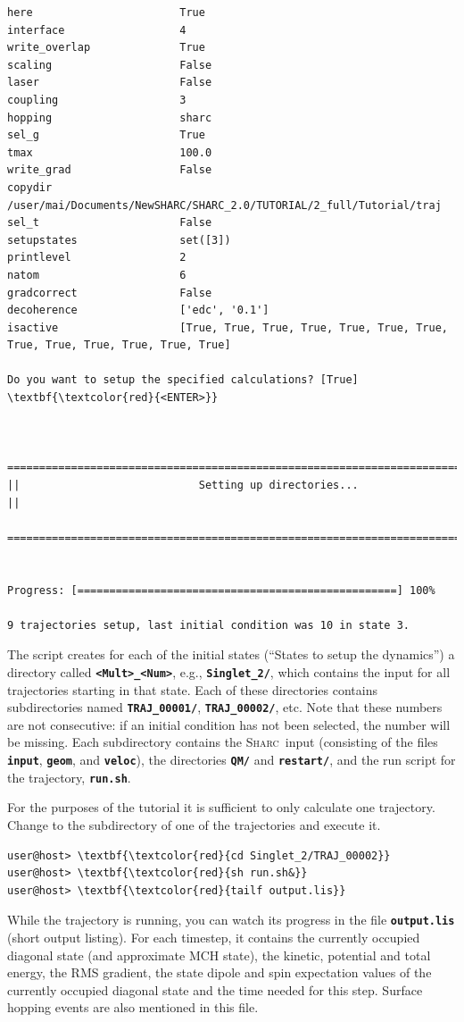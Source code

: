 \documentclass[a4paper,11pt,DIV=15,openany]{scrbook}
\newcommand{\sharc}{\textsc{Sharc}}
\newcommand{\ttt}[1]{\textbf{\texttt{#1}}}
\begin{document}
\begin{oframed}
\begin{Verbatim}[commandchars=\\\{\}]
here                       True
interface                  4
write_overlap              True
scaling                    False
laser                      False
coupling                   3
hopping                    sharc
sel_g                      True
tmax                       100.0
write_grad                 False
copydir                    /user/mai/Documents/NewSHARC/SHARC_2.0/TUTORIAL/2_full/Tutorial/traj
sel_t                      False
setupstates                set([3])
printlevel                 2
natom                      6
gradcorrect                False
decoherence                ['edc', '0.1']
isactive                   [True, True, True, True, True, True, True, True, True, True, True, True, True]

Do you want to setup the specified calculations? [True] \textbf{\textcolor{red}{<ENTER>}}


  ================================================================================
||                            Setting up directories...                           ||
  ================================================================================


Progress: [==================================================] 100%

9 trajectories setup, last initial condition was 10 in state 3.
\end{Verbatim}
\end{oframed}

\normalsize

The script creates for each of the initial states (``States to setup the dynamics'') a directory called \ttt{<Mult>\_<Num>}, e.g., \ttt{Singlet\_2/}, which contains the input for all trajectories starting in that state. 
Each of these directories contains subdirectories named \ttt{TRAJ\_00001/}, \ttt{TRAJ\_00002/}, etc. 
Note that these numbers are not consecutive: if an initial condition has not been selected, the number will be missing.
Each subdirectory contains the \sharc\ input (consisting of the files \ttt{input}, \ttt{geom}, and \ttt{veloc}), the directories \ttt{QM/} and \ttt{restart/}, and the run script for the trajectory, \ttt{run.sh}.

For the purposes of the tutorial it is sufficient to only calculate one trajectory. Change to the subdirectory of one of the trajectories and execute it.
\begin{Verbatim}[commandchars=\\\{\}]
user@host> \textbf{\textcolor{red}{cd Singlet_2/TRAJ_00002}}
user@host> \textbf{\textcolor{red}{sh run.sh&}}
user@host> \textbf{\textcolor{red}{tailf output.lis}}
\end{Verbatim}
While the trajectory is running, you can watch its progress in the file \ttt{output.lis} (short output listing). For each timestep, it contains the currently occupied diagonal state (and approximate MCH state), the kinetic, potential and total energy, the RMS gradient, the state dipole and spin expectation values of the currently occupied diagonal state and the time needed for this step. Surface hopping events are also mentioned in this file.
\end{document}

